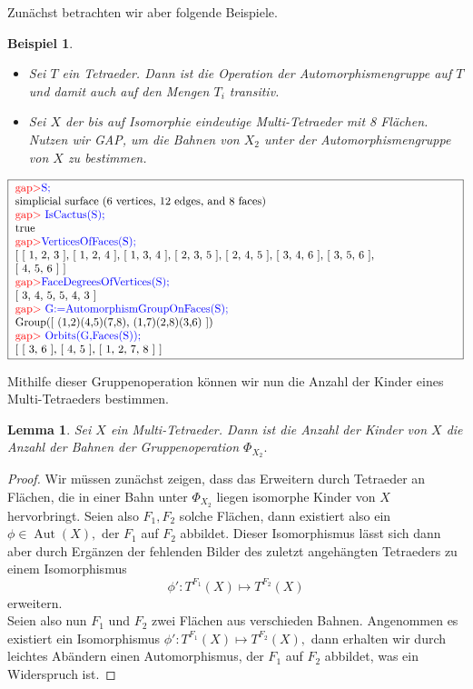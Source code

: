 \documentclass[12pt,titlepage,twoside,cleardoublepage]{article}
\theoremstyle{nummermitklammern}
\newtheorem{lemma}[temp]{Lemma}
\newtheorem{bsp}[temp]{Beispiel}
\newtheorem{lemma}[zahl]{Lemma}
\newtheorem{bsp}[zahl]{Beispiel}
\numberwithin{equation}{section}
\DeclareMathOperator{\Aut}{Aut}
\begin{document}
Zunächst betrachten wir aber folgende Beispiele. 
\begin{bsp}
\begin{itemize}
\item Sei $T$ ein Tetraeder. Dann ist die Operation der Automorphismengruppe auf $T$ und damit auch auf den Mengen $T_i$ transitiv.
\item Sei $X$ der bis auf Isomorphie eindeutige Multi-Tetraeder mit 8 Flächen. Nutzen wir GAP, um die Bahnen von $X_2$ unter der Automorphismengruppe von $X$ zu bestimmen.
\end{itemize}
\end{bsp}
\begin{center}
$\fbox{
\parbox{14cm} {
\textcolor{red}{gap$>$}\textcolor{blue}{ S;}\newline
simplicial surface (6 vertices, 12 edges, and 8 faces)\newline
\textcolor{red}{gap$>$} \textcolor{blue}{ IsCactus(S);}\newline
true\newline
\textcolor{red}{gap$>$}\textcolor{blue}{  VerticesOfFaces(S);}\newline
[ [ 1, 2, 3 ], [ 1, 2, 4 ], [ 1, 3, 4 ], [ 2, 3, 5 ], [ 2, 4, 5 ], [ 3, 4, 6 ], [ 3, 5, 6 ],\newline
  [ 4, 5, 6 ] ]\newline
\textcolor{red}{gap$>$}\textcolor{blue}{  FaceDegreesOfVertices(S);}\newline
[ 3, 4, 5, 5, 4, 3 ]\newline
\textcolor{red}{gap$>$} \textcolor{blue}{ G:=AutomorphismGroupOnFaces(S);}\newline
Group([ (1,2)(4,5)(7,8), (1,7)(2,8)(3,6) ])\newline
\textcolor{red}{gap$>$} \textcolor{blue}{ Orbits(G,Faces(S));}\newline
[ [ 3, 6 ], [ 4, 5 ], [ 1, 2, 7, 8 ] ]
}}$
\end{center}
Mithilfe dieser Gruppenoperation können wir nun die Anzahl der Kinder eines Multi-Tetraeders bestimmen.
\begin{lemma}
Sei $X$ ein Multi-Tetraeder. Dann ist die Anzahl der Kinder von $X$ die Anzahl der Bahnen der Gruppenoperation $\Phi_{X_2}.$
\end{lemma}
\begin{proof}
Wir müssen zunächst zeigen, dass das Erweitern durch Tetraeder an Flächen, die in einer Bahn unter $\Phi_{X_2}$ liegen isomorphe Kinder von $X$ hervorbringt. Seien also $F_1,F_2$ solche Flächen, dann existiert also ein $\phi \in \Aut(X),$ der $F_1$ auf $F_2$ abbildet. Dieser Isomorphismus lässt sich dann aber durch Ergänzen der fehlenden Bilder des zuletzt angehängten Tetraeders zu einem Isomorphismus 
\[
\phi':T^{F_1}(X)\mapsto T^{F_2}(X)
\]
 erweitern. \\
 Seien also nun $F_1$ und $F_2$ zwei Flächen aus verschieden Bahnen. Angenommen es existiert ein Isomorphismus $\phi':T^{F_1}(X)\mapsto T^{F_2}(X),$ dann erhalten wir durch leichtes Abändern einen Automorphismus, der $F_1$ auf $F_2$ abbildet, was ein Widerspruch ist. 
\end{proof}
\end{document}
